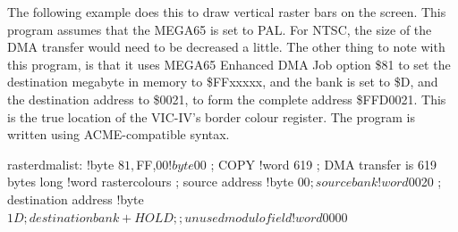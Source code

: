 The following example does this to draw vertical raster bars on the screen.
This program assumes that the MEGA65 is set to PAL.  For NTSC, the size of the DMA transfer
would need to be decreased a little.  The other thing to note with this program, is that
it uses MEGA65 Enhanced DMA Job option \$81 to set the destination megabyte in memory to
\$FFxxxxx, and the bank is set to \$D, and the destination address to \$0021, to form the
complete address \$FFD0021.  This is the true location of the VIC-IV's border colour register.
The program is written using ACME-compatible syntax.


\begin{asmcode}
rasterdmalist:
  !byte $81,$FF,$00
  !byte $00     ; COPY
  !word 619     ; DMA transfer is 619 bytes long
  !word rastercolours  ; source address
  !byte $00     ; source bank
  !word $0020   ; destination address
  !byte $1D     ; destination bank + HOLD
  ;; unused modulo field
  !word $0000
\end{asmcode}

